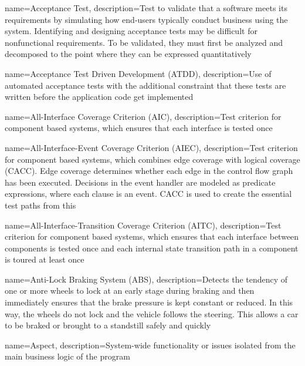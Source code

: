 {
	name={Acceptance Test},
	description={Test to validate that a software meets its requirements by simulating how end-users typically conduct business using the system. Identifying and designing acceptance tests may be difficult for nonfunctional requirements. To be validated, they must first be analyzed and decomposed to the point where they can be expressed quantitatively \cite{SWEBOK}}
}

{
	name={Acceptance Test Driven Development (ATDD)},
	description={Use of automated acceptance tests with the additional constraint that these tests are written before the application code get implemented \cite{longo}}
}

{
	name={All-Interface Coverage Criterion (AIC)},
	description={Test criterion for component based systems, which ensures that each interface is tested once \cite{Guan2015}}
}

{
	name={All-Interface-Event Coverage Criterion (AIEC)},
	description={Test criterion for component based systems, which combines edge coverage with logical coverage (CACC). Edge coverage determines whether each edge in the control flow graph has been executed. Decisions in the event handler are modeled as predicate expressions, where each clause is an event. CACC is used to create the essential test paths from this \cite{Guan2015}}
}

{
	name={All-Interface-Transition Coverage Criterion (AITC)},
	description={Test criterion for component based systems, which ensures that each interface between components is tested once and each internal state transition path in a component is toured at least once \cite{Guan2015}}
}

{
	name={Anti-Lock Braking System (ABS)},
	description={Detects the tendency of one or more wheels to lock at an early stage during braking and then immediately ensures that the brake pressure is kept constant or reduced. In this way, the wheels do not lock and the vehicle follows the steering. This allows a car to be braked or brought to a standstill safely and quickly \cite{Heinz2010}}
}

{
	name={Aspect},
	description={System-wide functionality or issues isolated from the main business logic of the program \cite{Kiczales1997}}
}

